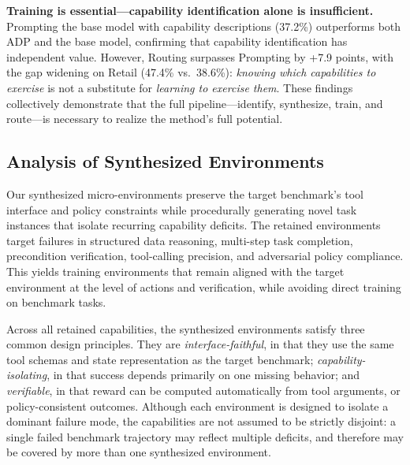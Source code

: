 \noindent\textbf{Training is essential---capability identification alone is insufficient.}
Prompting the base model with capability descriptions (37.2\%) outperforms both ADP and the base model, confirming that capability identification has independent value. However, Routing surpasses Prompting by +7.9 points, with the gap widening on Retail (47.4\% vs.\ 38.6\%): \emph{knowing which capabilities to exercise} is not a substitute for \emph{learning to exercise them}. These findings collectively demonstrate that the full pipeline---identify, synthesize, train, and route---is necessary to realize the method's full potential.






\subsection{Analysis of Synthesized Environments}

Our synthesized micro-environments preserve the target benchmark's tool interface and policy constraints while procedurally generating novel task instances that isolate recurring capability deficits. The retained environments target failures in structured data reasoning, multi-step task completion, precondition verification, tool-calling precision, and adversarial policy compliance. This yields training environments that remain aligned with the target environment at the level of actions and verification, while avoiding direct training on benchmark tasks.

Across all retained capabilities, the synthesized environments satisfy three common design principles. They are \emph{interface-faithful}, in that they use the same tool schemas and state representation as the target benchmark; \emph{capability-isolating}, in that success depends primarily on one missing behavior; and \emph{verifiable}, in that reward can be computed automatically from tool arguments, or policy-consistent outcomes. Although each environment is designed to isolate a dominant failure mode, the capabilities are not assumed to be strictly disjoint: a single failed benchmark trajectory may reflect multiple deficits, and therefore may be covered by more than one synthesized environment.



